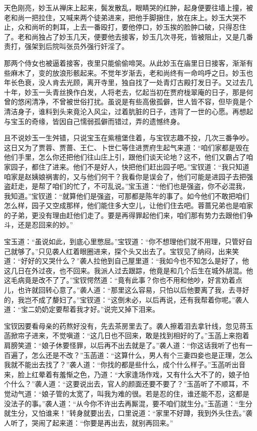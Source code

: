\documentclass[12pt,oneside]{book}
\begin{document}
天色刚亮，妙玉从禅床上起来，鬓发散乱，眼睛哭的红肿，起身便要往墙上撞，被老和尚一把拉住，又喊来两个徒弟进来，把他手脚捆住，放在床上。妙玉大哭不止，众和尚听的刺耳，上去一番殴打，要他停口，妙玉挨的脸肿口破，只得忍住了。老和尚独占了妙玉几天，便要他去接客，妙玉几次寻死，皆被阻止，又是几番责打，强架到后院叫张员外强行奸淫了。

那两个侍女也被逼着接客，夜里只能偷偷啼哭。从此妙玉在庙里日日接客，渐渐有些麻木了，变的放浪形骸起来。不觉年岁渐去，老和尚终有一命呜呼之日。妙玉也年长色衰，没人肯去光顾，离开寺里，独自找了一处青灯古殿打发日子。又过去几十年，妙玉一头青丝换作白发，人将老去，忆起当初在贾府栊翠庵的日子，那是何曾的悠闲清净，不曾被世俗打扰。虽说是有些高傲孤僻，世人皆不容，但毕竟是个清洁身子，谁料到头来竟沦入风尘，过着肮脏的日子，违背了一世的心愿。再想起与宝玉的奇缘，皆因自己懦弱孤僻而错过，弄的遗憾终身。

且不说妙玉一生舛错，只说宝玉在紫檀堡住着，与宝钗志趣不投，几次三番争吵。这日又为了贾蓉、贾蔷、王仁、卜世仁等住进贾府生起气来道：“咱们家都是毁在他们手里，怎么你还把他们往山庄上引，跟他们谈天论地？这不，他们又霸占了咱家园子，都住了进来。他们不是好人，快把他们赶出园子吧。”宝钗道：“我只知道咱家是赵姨娘祸害的，又与他们何干？我看你是误会了，他们可能是进园子去把强盗赶走，是帮了咱们的忙了，不可乱说。”宝玉道：“他们也是强盗，你不必混我，我知道。”宝钗道：“就算他们是强盗，可那都是陈年的事了。如今他们不敢把咱们怎么样，园子又空成那样，他们能住多大空儿，让他们住去吧。蓉蔷兄弟也是咱家的子弟，更没有理由赶他们走了。要是再得罪起他们来，咱们那有势力去跟他们争斗，还是忍回来的妙。”

宝玉道：“虽说如此，到底心里憋屈。”宝钗道：“你不想理他们就不用理，只管好自己就够了。”只见袭人红着眼圈进来，探个头又出去了。宝钗见了纳闷，出来笑道：“好好的又哭什么？”袭人拉他到自己屋里道：“我如今也不知怎么是好了，他这几日在外过夜，也不回来。我派人过去跟踪，他竟是和几个后生在城外胡混。他这毛病竟是改不了了。”宝钗愕然道：“竟有此事？你也不用和他吵，好言劝着点儿，也许就回转心意了。”袭人道：“那里这么容易，只怕以后他要离了我，去寻好的，我岂不成了嫠妇了。”宝钗道：“这倒未必，以后再说，还有我帮着你呢。”袭人道：“宝二奶奶定要帮着我才好。”说完又掉下泪来。

宝钗因要看母亲的药熬好没有，先去茶房里去了。袭人擦着泪去拿针线，忽见蒋玉菡掀帘子进来，不觉嗔道：“这几日也不回来，敢是找到相好的了。”玉菡上来抱着肩膀笑道：“娘子休要怪罪，以后再不出去就是了。”袭人道：“你这话我听了也有一百遍了，怎么还是不改？”玉菡道：“这算什么，男人有个三妻四妾也是正理，怎么我就不能出去找了？”袭人道：“你找的都是些什么，成个什么样子。”玉菡听出音来，脸上红晕着有羞惭之色，乃道：“大家逢场作戏，又有什么大不了的，娘子怕个什么？”袭人道：“这要说出去，官人的颜面还要不要了？”玉菡听了不顺耳，不觉动气道：“娘子管的太宽了，叫我为难的很。若是忍的住，谁还能不忍，这都是没法子的事。”袭人道：“从今你不许出去再厮混，要不咱们就生分。”玉菡道：“生分就生分，又怕谁来！”转身就要出去，口里说道：“家里不好蹲，我到外头住去。”袭人听了，哭闹了起来道：“你要是再出去，就别再回来。”
\end{document}
